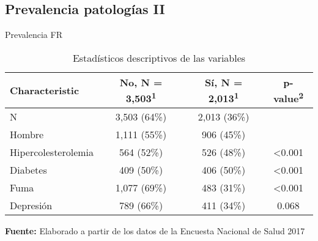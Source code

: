 \documentclass[aspectratio=169]{beamer}
\begin{document}
\subsection*{Prevalencia patologías II}
\begin{frame}{Prevalencia FR}
\begin{table}[]
\caption{\small Estadísticos descriptivos de las variables}
    \centering
    \small

    \captionsetup[table]{labelformat=empty,skip=1pt}
\begin{tabular}{lccc}
\toprule
\textbf{Characteristic} & \textbf{No}, N = 3,503\textsuperscript{1} & \textbf{Sí}, N = 2,013\textsuperscript{1} & \textbf{p-value}\textsuperscript{2} \\ 
\midrule
N & 3,503 (64\%) & 2,013 (36\%) &  \\ 
Hombre & 1,111 (55\%) & 906 (45\%) &  \\ 
Hipercolesterolemia & 564 (52\%) & 526 (48\%) & <0.001 \\
Diabetes & 409 (50\%) & 406 (50\%) & <0.001 \\ 
Fuma & 1,077 (69\%) & 483 (31\%) & <0.001 \\ 
Depresión & 789 (66\%) & 411 (34\%) & 0.068 \\ 
 \bottomrule
\end{tabular}
    \vspace{5mm}
    
    {\raggedright \small \textbf{Fuente:} Elaborado a partir de los datos de la Encuesta Nacional de Salud 2017 \par}
\end{table}
\end{frame}
\end{document}
